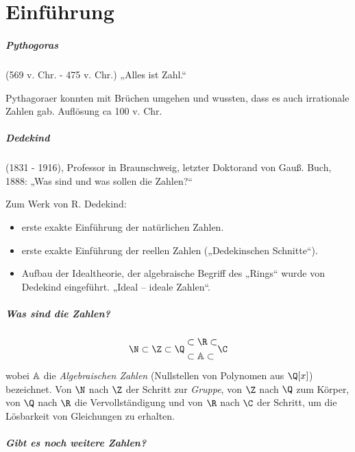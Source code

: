 \chapter{Einführung}



\paragraph{Pythogoras}
(569 v. Chr. - 475 v. Chr.) „Alles ist Zahl.“

Pythagoraer konnten mit Brüchen umgehen und wussten, dass es auch irrationale Zahlen gab.
Auflösung ca 100 v. Chr.

\paragraph{Dedekind}
(1831 - 1916), Professor in Braunschweig, letzter Doktorand von Gauß.
Buch, 1888: „Was sind und was sollen die Zahlen?“

Zum Werk von R. Dedekind:
\begin{itemize}
	\item
		erste exakte Einführung der natürlichen Zahlen.
	\item
		erste exakte Einführung der reellen Zahlen („Dedekinschen Schnitte“).
	\item
		Aufbau der Idealtheorie, der algebraische Begriff des „Rings“ wurde von Dedekind eingeführt.
		„Ideal – ideale Zahlen“.
\end{itemize}


\paragraph{Was sind die Zahlen?}

\begin{align*}
	\N \subset \Z \subset \Q
	\begin{aligned}
		&\subset \R \subset \\
		&\subset \A \subset
	\end{aligned}
	\C
\end{align*}
wobei $\mathbb{A}$ die \emph{Algebraischen Zahlen} (Nullstellen von Polynomen aus $\Q[x]$) bezeichnet.
Von $\N$ nach $\Z$ der Schritt zur \emph{Gruppe}, von $\Z$ nach $\Q$ zum Körper, von $\Q$ nach $\R$ die Vervollständigung und von $\R$ nach $\C$ der Schritt, um die Lösbarkeit von Gleichungen zu erhalten.

\paragraph{Gibt es noch weitere Zahlen?}

